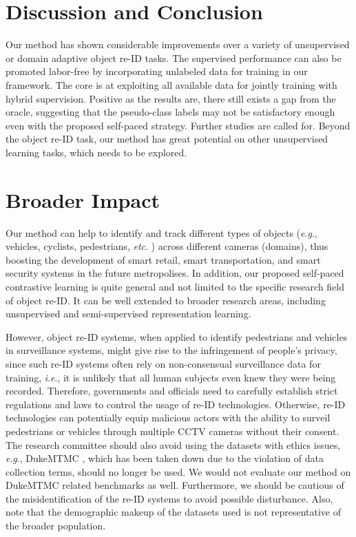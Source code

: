 \documentclass{article}
\newcommand{\ie}{\textit{i}.\textit{e}., }
\newcommand{\eg}{\textit{e}.\textit{g}., }
\newcommand{\etc}{\textit{etc}. }
\begin{document}
\vspace{-10pt}
\section{Discussion and Conclusion}
\vspace{-5pt}

Our method has shown considerable improvements over a variety of unsupervised or domain adaptive object re-ID tasks. 
The supervised performance can also be promoted labor-free by 
incorporating unlabeled data for training in our framework.
The core is at exploiting all available data for jointly training with hybrid supervision.
Positive as the results are, 
there still exists a gap from the oracle,
suggesting that the pseudo-class labels may not be satisfactory enough even with the proposed self-paced strategy. 
Further studies are called for.
Beyond the object re-ID task,
our  
method
has great potential on other unsupervised learning tasks, which needs to be explored.


\clearpage
\section*{Broader Impact}



Our method can help to identify and track different types of objects (\eg vehicles, cyclists, pedestrians, \etc) across different cameras (domains), thus boosting the development of smart retail, smart transportation, and smart security systems in the future metropolises. In addition, our proposed self-paced contrastive learning is quite general and not limited to the specific research field of object re-ID. It can be well extended to broader research areas, including unsupervised and semi-supervised representation learning. 

However, object re-ID systems, when applied to identify pedestrians and vehicles in surveillance systems, might give rise to the infringement of people's privacy, since such re-ID systems often rely on non-consensual surveillance data for training, \ie it is unlikely that all human subjects even knew they were being recorded.
Therefore, governments and officials need to carefully establish strict regulations and laws to control the usage of re-ID technologies. 
Otherwise, re-ID technologies can potentially equip malicious actors with the ability to surveil pedestrians or vehicles through multiple CCTV cameras without their consent.
The research committee should also avoid using the datasets with ethics issues, \eg DukeMTMC \cite{dukemtmc}, which has been taken down due to the violation of data collection terms, should no longer be used. We would not evaluate our method on DukeMTMC related benchmarks as well. 
Furthermore, we should be cautious of the misidentification of the re-ID systems to avoid possible disturbance.
Also, note that the demographic makeup of the datasets used is not representative of the broader population.
\end{document}
